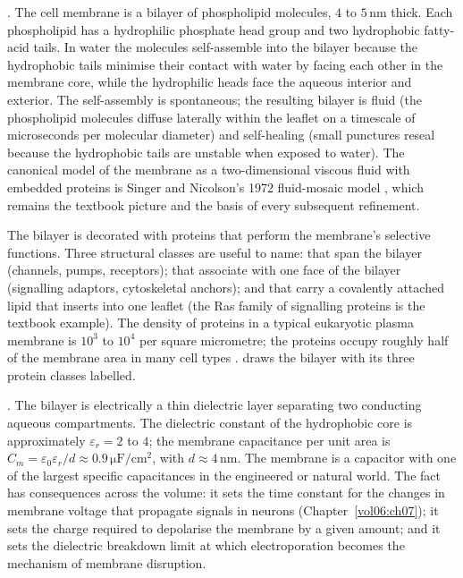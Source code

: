 . The cell membrane is a bilayer of
phospholipid molecules, $4$ to $5\,\si{\nano\meter}$ thick. Each
phospholipid has a hydrophilic phosphate head group and two
hydrophobic fatty-acid tails. In water the molecules self-assemble
into the bilayer because the hydrophobic tails minimise their contact
with water by facing each other in the membrane core, while the
hydrophilic heads face the aqueous interior and exterior. The
self-assembly is spontaneous; the resulting bilayer is fluid (the
phospholipid molecules diffuse laterally within the leaflet on a
timescale of microseconds per molecular diameter) and self-healing
(small punctures reseal because the hydrophobic tails are unstable
when exposed to water). The canonical model of the membrane as a
two-dimensional viscous fluid with embedded proteins is Singer and
Nicolson's 1972 fluid-mosaic model
\cite{paper:v6c01-singer-nicolson-1972}, which remains the textbook
picture and the basis of every subsequent refinement.

The bilayer is decorated with proteins that perform the membrane's
selective functions. Three structural classes are useful to name:
 that span the bilayer (channels,
pumps, receptors);  that
associate with one face of the bilayer (signalling adaptors,
cytoskeletal anchors); and  that
carry a covalently attached lipid that inserts into one leaflet (the
Ras family of signalling proteins is the textbook example). The
density of proteins in a typical eukaryotic plasma membrane is
$10^3$ to $10^4$ per square micrometre; the proteins occupy roughly
half of the membrane area in many cell types
\cite[ch.~10]{text:v6c01-alberts-mbc-2022}.
 draws the bilayer with its
three protein classes labelled.



. The bilayer is electrically
a thin dielectric layer separating two conducting aqueous compartments.
The dielectric constant of the hydrophobic core is approximately
$\varepsilon_r = 2$ to $4$; the membrane capacitance per unit area is
$C_m = \varepsilon_0 \varepsilon_r/d \approx 0.9\,\si{\micro\farad}/
\text{cm}^2$, with $d \approx 4\,\si{\nano\meter}$. The membrane is a
capacitor with one of the largest specific capacitances in the
engineered or natural world. The fact has consequences across the
volume: it sets the time constant for the changes in membrane voltage
that propagate signals in neurons (Chapter~\ref{vol06:ch07}); it sets
the charge required to depolarise the membrane by a given amount; and
it sets the dielectric breakdown limit at which electroporation
becomes the mechanism of membrane disruption.

